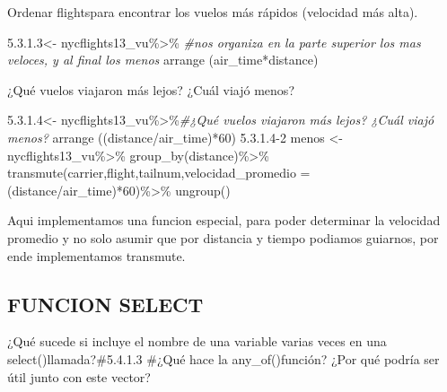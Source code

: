 \documentclass[
]{article}
\newenvironment{Shaded}{\begin{snugshade}}{\end{snugshade}}
\newcommand{\AttributeTok}[1]{\textcolor[rgb]{0.77,0.63,0.00}{#1}}
\newcommand{\CommentTok}[1]{\textcolor[rgb]{0.56,0.35,0.01}{\textit{#1}}}
\newcommand{\DecValTok}[1]{\textcolor[rgb]{0.00,0.00,0.81}{#1}}
\newcommand{\FunctionTok}[1]{\textcolor[rgb]{0.00,0.00,0.00}{#1}}
\newcommand{\NormalTok}[1]{#1}
\newcommand{\OtherTok}[1]{\textcolor[rgb]{0.56,0.35,0.01}{#1}}
\newcommand{\SpecialCharTok}[1]{\textcolor[rgb]{0.00,0.00,0.00}{#1}}
\newcommand{\StringTok}[1]{\textcolor[rgb]{0.31,0.60,0.02}{#1}}
\begin{document}
Ordenar flightspara encontrar los vuelos más rápidos (velocidad más
alta).

\begin{Shaded}
\begin{Highlighting}[]
\StringTok{\textquotesingle{}5.3.1.3\textquotesingle{}}\OtherTok{\textless{}{-}}\NormalTok{ nycflights13\_vu}\SpecialCharTok{\%\textgreater{}\%} \CommentTok{\#nos organiza en la parte superior los mas veloces, y al final los menos}
  \FunctionTok{arrange}\NormalTok{ (air\_time}\SpecialCharTok{*}\NormalTok{distance)}
\end{Highlighting}
\end{Shaded}

¿Qué vuelos viajaron más lejos? ¿Cuál viajó menos?

\begin{Shaded}
\begin{Highlighting}[]
\StringTok{\textquotesingle{}5.3.1.4\textquotesingle{}}\OtherTok{\textless{}{-}}\NormalTok{ nycflights13\_vu}\SpecialCharTok{\%\textgreater{}\%}\CommentTok{\#¿Qué vuelos viajaron más lejos? ¿Cuál viajó menos?}
  \FunctionTok{arrange}\NormalTok{ ((distance}\SpecialCharTok{/}\NormalTok{air\_time)}\SpecialCharTok{*}\DecValTok{60}\NormalTok{)}
\StringTok{\textquotesingle{}5.3.1.4{-}2 menos\textquotesingle{}} \OtherTok{\textless{}{-}}\NormalTok{ nycflights13\_vu}\SpecialCharTok{\%\textgreater{}\%}
  \FunctionTok{group\_by}\NormalTok{(distance)}\SpecialCharTok{\%\textgreater{}\%}
\FunctionTok{transmute}\NormalTok{(carrier,flight,tailnum,}\AttributeTok{velocidad\_promedio =}\NormalTok{ (distance}\SpecialCharTok{/}\NormalTok{air\_time)}\SpecialCharTok{*}\DecValTok{60}\NormalTok{)}\SpecialCharTok{\%\textgreater{}\%}
  \FunctionTok{ungroup}\NormalTok{()}
\end{Highlighting}
\end{Shaded}

Aqui implementamos una funcion especial, para poder determinar la
velocidad promedio y no solo asumir que por distancia y tiempo podiamos
guiarnos, por ende implementamos transmute.

\hypertarget{funcion-select}{%
\subsection{FUNCION SELECT}\label{funcion-select}}

¿Qué sucede si incluye el nombre de una variable varias veces en una
select()llamada?\#5.4.1.3 \#¿Qué hace la any\_of()función? ¿Por qué
podría ser útil junto con este vector?
\end{document}

